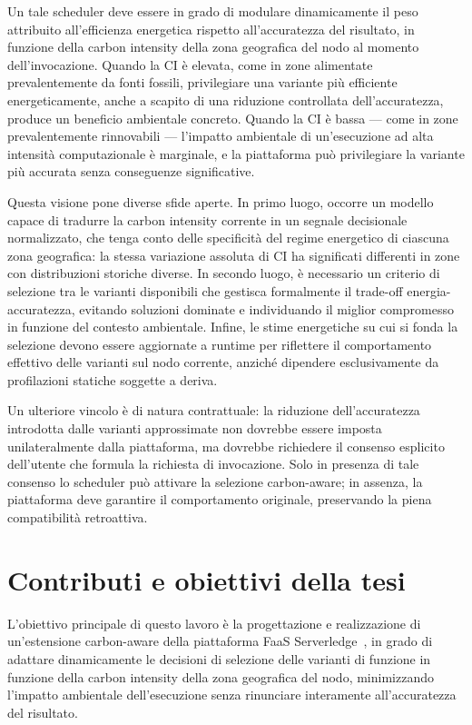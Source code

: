 Un tale scheduler deve essere in grado di modulare dinamicamente il peso attribuito
all'efficienza energetica rispetto all'accuratezza del risultato, in funzione della carbon
intensity della zona geografica del nodo al momento dell'invocazione.
Quando la CI è elevata, come in zone alimentate prevalentemente da fonti fossili, 
privilegiare una variante più efficiente energeticamente, anche a scapito di una
riduzione controllata dell'accuratezza, produce un beneficio ambientale concreto.
Quando la CI è bassa — come in zone prevalentemente rinnovabili — l'impatto
ambientale di un'esecuzione ad alta intensità computazionale è marginale, e la
piattaforma può privilegiare la variante più accurata senza conseguenze significative.

Questa visione pone diverse sfide aperte.
In primo luogo, occorre un modello capace di tradurre la carbon intensity corrente
in un segnale decisionale normalizzato, che tenga conto delle specificità del regime
energetico di ciascuna zona geografica: la stessa variazione assoluta di CI ha significati
differenti in zone con distribuzioni storiche diverse.
In secondo luogo, è necessario un criterio di selezione tra le varianti disponibili che
gestisca formalmente il trade-off energia-accuratezza, evitando soluzioni dominate e
individuando il miglior compromesso in funzione del contesto ambientale.
Infine, le stime energetiche su cui si fonda la selezione devono essere aggiornate
a runtime per riflettere il comportamento effettivo delle varianti sul nodo corrente,
anziché dipendere esclusivamente da profilazioni statiche soggette a deriva.

Un ulteriore vincolo è di natura contrattuale: la riduzione dell'accuratezza introdotta
dalle varianti approssimate non dovrebbe essere imposta unilateralmente dalla piattaforma,
ma dovrebbe richiedere il consenso esplicito dell'utente che formula la richiesta di invocazione.
Solo in presenza di tale consenso lo scheduler può attivare la selezione carbon-aware;
in assenza, la piattaforma deve garantire il comportamento originale, preservando la
piena compatibilità retroattiva.

\section{Contributi e obiettivi della tesi}

L'obiettivo principale di questo lavoro è la progettazione e realizzazione di
un'estensione carbon-aware della piattaforma FaaS
Serverledge~\cite{Russo2023_Serverledge}, in grado di adattare dinamicamente le
decisioni di selezione delle varianti di funzione in funzione della carbon intensity della
zona geografica del nodo, minimizzando l'impatto ambientale dell'esecuzione senza
rinunciare interamente all'accuratezza del risultato.

